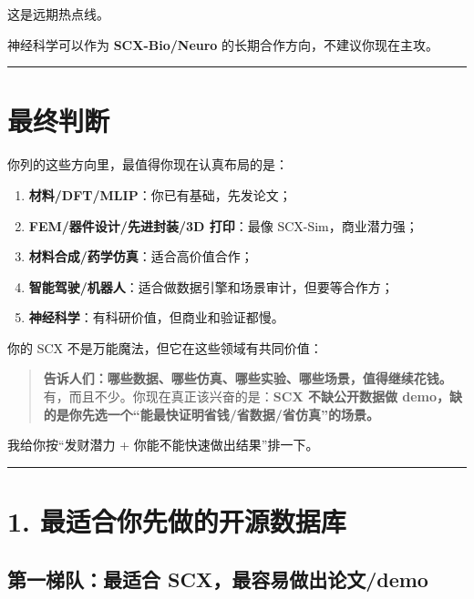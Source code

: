\documentclass[
  12pt,
]{ctexart}
\providecommand{\tightlist}{%
  \setlength{\itemsep}{0pt}\setlength{\parskip}{0pt}}
\begin{document}
这是远期热点线。

神经科学可以作为 \textbf{SCX-Bio/Neuro}
的长期合作方向，不建议你现在主攻。

\begin{center}\rule{0.5\linewidth}{0.5pt}\end{center}

\section{最终判断}\label{ux6700ux7ec8ux5224ux65ad-1}

你列的这些方向里，最值得你现在认真布局的是：

\begin{enumerate}
\def\labelenumi{\arabic{enumi}.}
\tightlist
\item
  \textbf{材料/DFT/MLIP}：你已有基础，先发论文；
\item
  \textbf{FEM/器件设计/先进封装/3D 打印}：最像 SCX-Sim，商业潜力强；
\item
  \textbf{材料合成/药学仿真}：适合高价值合作；
\item
  \textbf{智能驾驶/机器人}：适合做数据引擎和场景审计，但要等合作方；
\item
  \textbf{神经科学}：有科研价值，但商业和验证都慢。
\end{enumerate}

你的 SCX 不是万能魔法，但它在这些领域有共同价值：

\begin{quote}
\textbf{告诉人们：哪些数据、哪些仿真、哪些实验、哪些场景，值得继续花钱。}
有，而且不少。你现在真正该兴奋的是：\textbf{SCX 不缺公开数据做
demo，缺的是你先选一个``能最快证明省钱/省数据/省仿真''的场景。}
\end{quote}

我给你按``发财潜力 + 你能不能快速做出结果''排一下。

\begin{center}\rule{0.5\linewidth}{0.5pt}\end{center}

\section{1.
最适合你先做的开源数据库}\label{ux6700ux9002ux5408ux4f60ux5148ux505aux7684ux5f00ux6e90ux6570ux636eux5e93}

\subsection{第一梯队：最适合
SCX，最容易做出论文/demo}\label{ux7b2cux4e00ux68afux961fux6700ux9002ux5408-scxux6700ux5bb9ux6613ux505aux51faux8bbaux6587demo}
\end{document}
